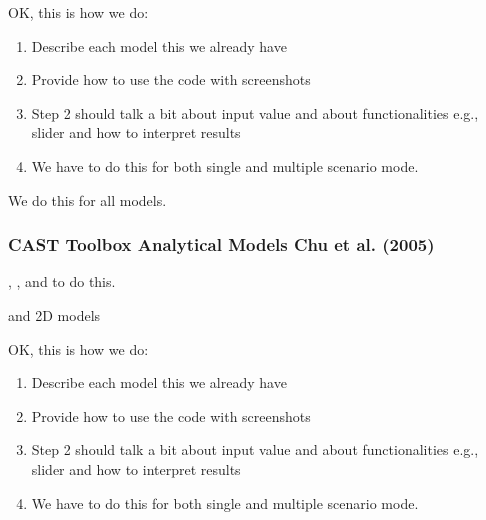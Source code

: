 \documentclass[letterpaper,10pt,english]{sphinxmanual}
\begin{document}
\sphinxAtStartPar
OK, this is how we do:
\begin{enumerate}
%
\item {} 
\sphinxAtStartPar
Describe each model \sphinxhyphen{} this we already have

\item {} 
\sphinxAtStartPar
Provide how to use the code with screenshots

\item {} 
\sphinxAtStartPar
Step 2 should talk a bit about input value and about functionalities \sphinxhyphen{} e.g., slider and how to interpret results

\item {} 
\sphinxAtStartPar
We have to do this for both single and multiple scenario mode.

\end{enumerate}

\sphinxAtStartPar
We do this for all models.


\subsubsection{CAST Toolbox \sphinxhyphen{} Analytical Models \sphinxhyphen{} Chu et al. (2005)}
\label{\detokenize{contents/toolbox/an_model/chu2005:cast-toolbox-analytical-models-chu-et-al-2005}}\label{\detokenize{contents/toolbox/an_model/chu2005::doc}}
\sphinxAtStartPar
{}, ,  and  to do this.

\sphinxAtStartPar
{} and  \sphinxhyphen{} 2D models

\sphinxAtStartPar
OK, this is how we do:
\begin{enumerate}
%
\item {} 
\sphinxAtStartPar
Describe each model \sphinxhyphen{} this we already have

\item {} 
\sphinxAtStartPar
Provide how to use the code with screenshots

\item {} 
\sphinxAtStartPar
Step 2 should talk a bit about input value and about functionalities \sphinxhyphen{} e.g., slider and how to interpret results

\item {} 
\sphinxAtStartPar
We have to do this for both single and multiple scenario mode.

\end{enumerate}
\end{document}
